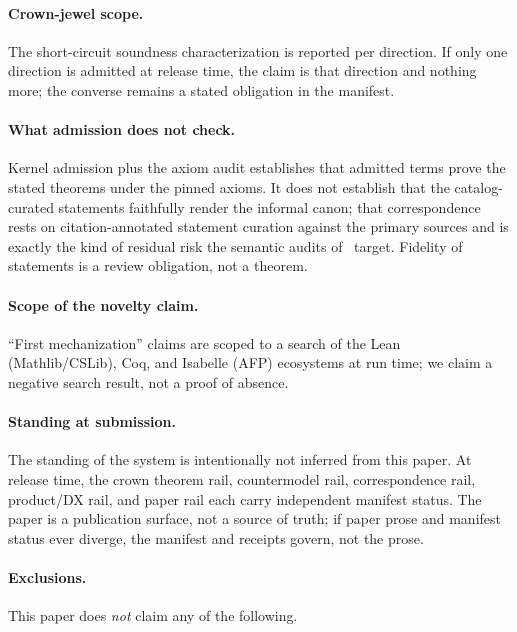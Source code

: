 \documentclass[11pt]{article}
\newif\ifreleasebuild
\begin{document}
\paragraph{Crown-jewel scope.}
The short-circuit soundness characterization is reported per direction. If
only one direction is admitted at release time, the claim is that direction
and nothing more; the converse remains a stated obligation in the manifest.
\ifreleasebuild
  
\else
\fi

\paragraph{What admission does not check.}
Kernel admission plus the axiom audit establishes that admitted terms prove
the stated theorems under the pinned axioms. It does not establish that
the catalog-curated statements faithfully render the informal canon; that
correspondence rests on citation-annotated statement curation against the
primary sources and is exactly the kind of residual risk the semantic
audits of~\cite{meek2026formalizing} target. Fidelity of statements is a
review obligation, not a theorem.

\paragraph{Scope of the novelty claim.}
``First mechanization'' claims are scoped to a search of the Lean
(Mathlib/CSLib), Coq, and Isabelle (AFP) ecosystems at run time; we claim a
negative search result, not a proof of absence.

\paragraph{Standing at submission.}
The standing of the system is intentionally not inferred from this paper.
At release time, the crown theorem rail, countermodel rail, correspondence
rail, product/DX rail, and paper rail each carry independent manifest
status. The paper is a publication surface, not a source of truth; if
paper prose and manifest status ever diverge, the manifest and receipts
govern, not the prose.

\paragraph{Exclusions.}
This paper does \emph{not} claim any of the following.
\end{document}
